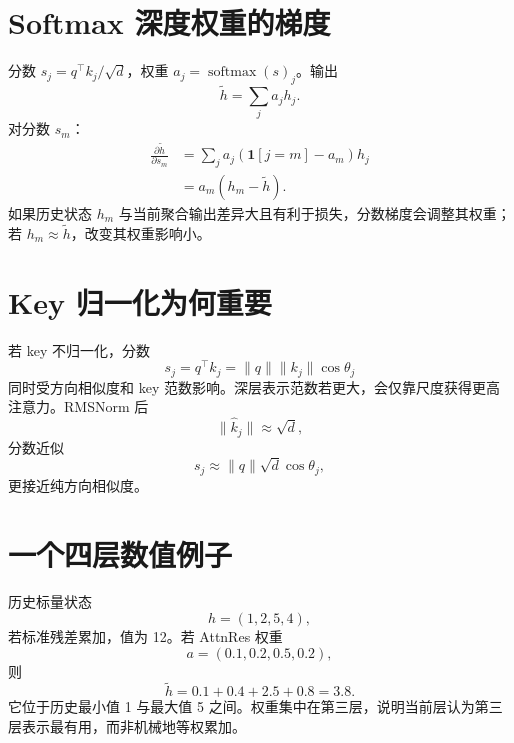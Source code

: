\documentclass[UTF8,12pt,a4paper,fontset=none]{ctexart}
\numberwithin{equation}{section}
\newcommand{\softmax}{\operatorname{softmax}}
\begin{document}
\section{Softmax 深度权重的梯度}
分数 $s_j=q^\top k_j/\sqrt d$，权重 $a_j=\softmax(s)_j$。输出
\begin{equation}
 \widetilde h=\sum_ja_jh_j.
\end{equation}
对分数 $s_m$：
\begin{align}
 \frac{\partial\widetilde h}{\partial s_m}
 &=\sum_j a_j(\mathbf 1[j=m]-a_m)h_j\\
 &=a_m(h_m-\widetilde h).
\end{align}
如果历史状态 $h_m$ 与当前聚合输出差异大且有利于损失，分数梯度会调整其权重；若 $h_m\approx\widetilde h$，改变其权重影响小。

\section{Key 归一化为何重要}
若 key 不归一化，分数
\begin{equation}
 s_j=q^\top k_j=\|q\|\|k_j\|\cos\theta_j
\end{equation}
同时受方向相似度和 key 范数影响。深层表示范数若更大，会仅靠尺度获得更高注意力。RMSNorm 后
\begin{equation}
 \|\widehat k_j\|\approx\sqrt d,
\end{equation}
分数近似
\begin{equation}
 s_j\approx\|q\|\sqrt d\cos\theta_j,
\end{equation}
更接近纯方向相似度。

\section{一个四层数值例子}
历史标量状态
\begin{equation}
 h=(1,2,5,4),
\end{equation}
若标准残差累加，值为 12。若 AttnRes 权重
\begin{equation}
 a=(0.1,0.2,0.5,0.2),
\end{equation}
则
\begin{equation}
 \widetilde h=0.1+0.4+2.5+0.8=3.8.
\end{equation}
它位于历史最小值 1 与最大值 5 之间。权重集中在第三层，说明当前层认为第三层表示最有用，而非机械地等权累加。
\end{document}

